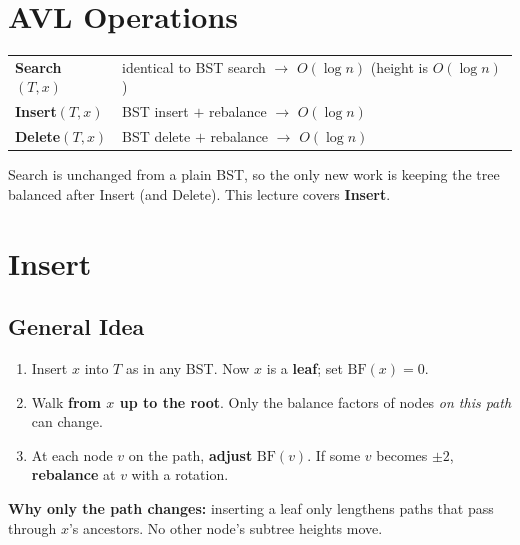 \documentclass[11pt]{article}
\begin{document}
\section{AVL Operations}

\begin{keybox}
\renewcommand{\arraystretch}{1.4}
\begin{tabular}{l l}
\textcolor{heapblue}{\textbf{Search}$(T, x)$} & identical to BST search $\to$ \textcolor{greenO}{$O(\log n)$} (height is $O(\log n)$)\\
\textcolor{heapblue}{\textbf{Insert}$(T, x)$} & BST insert $+$ rebalance $\to$ \textcolor{violetT}{$O(\log n)$}\\
\textcolor{heapblue}{\textbf{Delete}$(T, x)$} & BST delete $+$ rebalance $\to$ \textcolor{violetT}{$O(\log n)$}\\
\end{tabular}
\end{keybox}

Search is unchanged from a plain BST, so the only new work is keeping the tree balanced after Insert (and Delete). This lecture covers \textbf{Insert}.

\section{Insert}

\subsection{General Idea}

\begin{keybox}
\begin{enumerate}[leftmargin=1.6em,itemsep=2pt]
  \item Insert $x$ into $T$ as in any BST. Now $x$ is a \textbf{leaf}; set $\text{BF}(x) = 0$.
  \item Walk \textbf{from $x$ up to the root}. Only the balance factors of nodes \emph{on this path} can change.
  \item At each node $v$ on the path, \textbf{adjust} $\text{BF}(v)$. If some $v$ becomes $\pm 2$, \textbf{rebalance} at $v$ with a rotation.
\end{enumerate}
\end{keybox}

\textbf{Why only the path changes:} inserting a leaf only lengthens paths that pass through $x$'s ancestors. No other node's subtree heights move.
\end{document}
